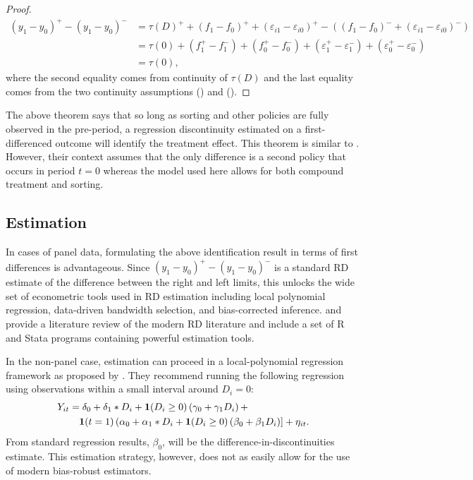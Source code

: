 \documentclass[12pt]{article}
\begin{document}
\begin{proof}
    \begin{align*}
        (y_1 - y_0)^+ - (y_1 - y_0)^- &= \tau(D)^{+} + (f_1 - f_0)^+  + (\varepsilon_{i1} - \varepsilon_{i0})^+ - ((f_1 - f_0)^-  + (\varepsilon_{i1} - \varepsilon_{i0})^-) \\
        &= \tau(0) + (f_1^+ - f_1^-) + (f_0^+ - f_0^-) + (\varepsilon_1^+ - \varepsilon_1^-) + (\varepsilon_0^+ - \varepsilon_0^-) \\
        &= \tau(0),
    \end{align*}
    where the second equality comes from continuity of $\tau(D)$ and the last equality comes from the two continuity assumptions () and ().
\end{proof}

The above theorem says that so long as sorting and other policies are fully observed in the pre-period, a regression discontinuity estimated on a first-differenced outcome will identify the treatment effect. This theorem is similar to \citet{Grembi_Nannicini_Troiano_2016}. However, their context assumes that the only difference is a second policy that occurs in period $t = 0$ whereas the model used here allows for both compound treatment and sorting. 


\subsection{Estimation}

In cases of panel data, formulating the above identification result in terms of first differences is advantageous. Since $(y_1 - y_0)^+ - (y_1 - y_0)^-$ is a standard RD estimate of the difference between the right and left limits, this  unlocks the wide set of econometric tools used in RD estimation including local polynomial regression, data-driven bandwidth selection, and bias-corrected inference. \citet{Cattaneo_Idrobo_Titiunik_2019} and \citet{Cattaneo_Idrobo_Titiunik} provide a literature review of the modern RD literature and include a set of R and Stata programs containing powerful estimation tools.

In the non-panel case, estimation can proceed in a local-polynomial regression framework as proposed by \citet{Grembi_Nannicini_Troiano_2016}. They recommend running the following regression using observations within a small interval around $D_i = 0$: 
\begin{align*}
    Y_{it} &= \delta_0 + \delta_1 * D_{i} + \mathbf{1}(D_i \geq 0) \left( \gamma_0 + \gamma_1 D_i \right) + \\ 
    &\quad \mathbf{1}(t = 1) \left( \alpha_0 + \alpha_1 * D_{i} + \mathbf{1}(D_i \geq 0) \left( \beta_0 + \beta_1 D_i \right) \right] + \eta_{it}.
\end{align*}
From standard regression results, $\beta_0$, will be the difference-in-discontinuities estimate. This estimation strategy, however, does not as easily allow for the use of modern bias-robust estimators.
\end{document}
